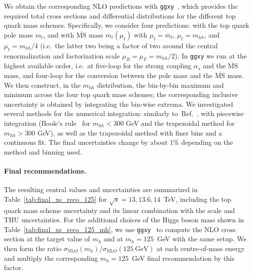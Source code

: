 We obtain the corresponding NLO predictions with \texttt{ggxy}~\cite{Davies:2025qjr}, which provides the required total cross sections and differential distributions for the different top quark mass schemes. Specifically, we consider four predictions: with the top quark pole mass $m_t$, and with $\overline{\mathrm{MS}}$ mass $\overline{m}_t(\mu_t)$ with $\mu_t = \overline{m}_t$, $\mu_t = m_{hh}$, and $\mu_t = m_{hh}/4$ (i.e.~the latter two being a factor of two around the central renormalization and factorization scale $\mu_R=\mu_F=m_{hh}/2$). In \texttt{ggxy} we run at the highest available order, i.e.~at five-loop for the strong coupling $\alpha_s$ and the $\overline{\mathrm{MS}}$ mass, and four-loop for the conversion between the pole mass and the $\overline{\mathrm{MS}}$ mass. We then construct, in the $m_{hh}$ distribution, the bin-by-bin maximum and minimum across the four top quark mass schemes; the corresponding inclusive uncertainty is obtained by integrating the bin-wise extrema. We investigated several methods for the numerical integration: similarly to~Ref.~\cite{Baglio:2020ini}, with piecewise integration (Boole's rule~\cite{boole1880,Abramowitz1964} for $m_{hh} < 300$ GeV and the trapezoidal method for $m_{hh}>300$ GeV), as well as the trapezoidal method with finer bins and a continuous fit. The final uncertainties change by about 1\% depending on the method and binning used.



\paragraph{Final recommendations.}
The resulting central values and uncertainties are summarized in Table~\ref{tab:final_xs_reco_125} for $\sqrt{s}=13, 13.6, 14$~TeV, including the top quark mass scheme uncertainty and its linear combination with the scale and THU uncertainties. For the additional choices of the Higgs boson mass shown in Table~\ref{tab:final_xs_reco_125_mh}, we use \texttt{ggxy}~\cite{Davies:2025qjr} to compute the NLO cross section at the target value of $m_h$ and at $m_h=125$~GeV with the same setup. We then form the ratio $\sigma_{\mathrm{NLO}}(m_h)/\sigma_{\mathrm{NLO}}(125~\mathrm{GeV})$ at each centre-of-mass energy and multiply the corresponding $m_h=125$~GeV final recommendation by this factor.

